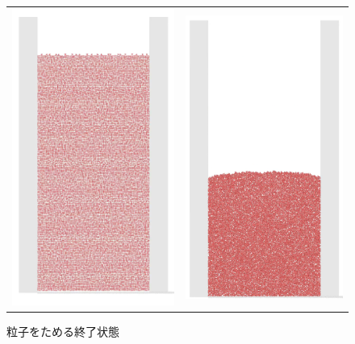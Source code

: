 \documentclass[12pt]{ltjsarticle}
\begin{document}
\begin{figure}[htbp]
  \begin{tabular}{cc}
    \begin{minipage}[t]{.5\textwidth}
      \centering
      \includegraphics*[keepaspectratio, scale=0.3]{tameru_mae.PNG}
      \caption{粒子をためる初期状態}
    \end{minipage} &

    \begin{minipage}[t]{.5\textwidth}
      \centering
      \includegraphics*[keepaspectratio, scale=0.3]{tameru_ato.PNG}
      \caption{粒子をためる終了状態}
    \end{minipage}
  \end{tabular}
\end{figure}
\end{document}
